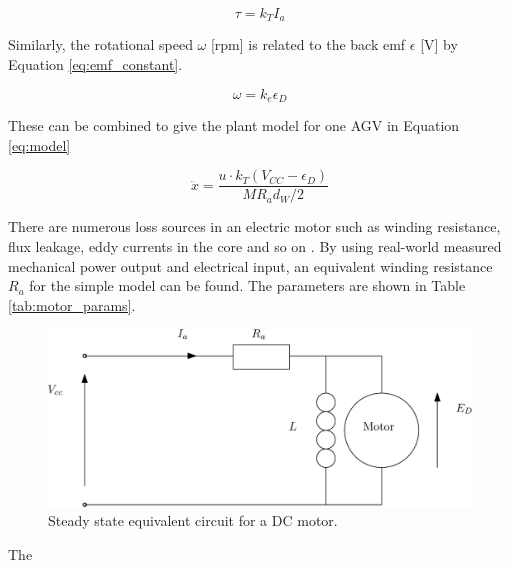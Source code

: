 \begin{equation}
\tau = k_T I_a
\label{eq:torque_constant}
\end{equation} 

Similarly, the rotational speed $\omega$ [rpm] is related to the back emf $\epsilon$ [V] by Equation \ref{eq:emf_constant}.

\begin{equation}
\omega = {k_e}\epsilon_D 
\label{eq:emf_constant}
\end{equation}

These can be combined to give the plant model for one AGV in Equation \ref{eq:model}

\begin{equation}
\ddot{x} =\frac{ u \cdot k_T (V_{CC} - \epsilon_D) }{M R_a d_W/2}
\label{eq:model}
\end{equation}

 There are numerous loss sources in an electric motor such as winding resistance, flux leakage, eddy currents in the core and so on \cite{Sarlioglu2016}. By using real-world measured mechanical power output and electrical input, an equivalent winding resistance $R_a$ for the simple model can be found. The parameters are shown in Table \ref{tab:motor_params}.

\begin{figure}[ht]
	\centering
	\includegraphics[width=0.9\linewidth]{dc_circuit.eps}
	\caption{Steady state equivalent circuit for a DC motor.}
	\label{fig:dc_circuit}
\end{figure}

The 

